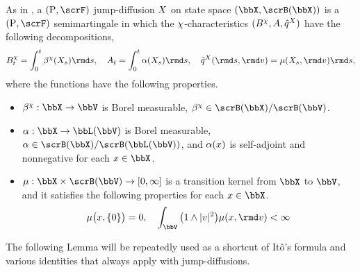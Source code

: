 As in \cite[Definition III.2.18]{jacod2003}, a $(\Prb, \scrF)$ jump-diffusion $X$ on state space $(\stateSpace, \scrB(\stateSpace))$ is a $(\Prb, \scrF)$ semimartingale in which the $\chi$-characteristics $(B^\chi, A, \hat{q}^X)$ have the following decompositions,
\begin{equation}
  \label{eq:jump-diffusion-characteristics}
  B^\trunc_t = \int_0^t \affDrift^\trunc(\X_s) \rmd s, \quad 
  A_t = \int_0^t \affDiff(\X_s) \rmd s, \quad
  \predproj{\jumpMeas^\X}(\rmd s,\rmd\markVar) = \affJump(\X_s, \rmd\markVar) \rmd s,
\end{equation}
where the functions have the following properties.
\begin{itemize}
  \item
    $\affDrift^\trunc: \stateSpace \rightarrow \vecSpace$ is Borel measurable, $\affDrift^\trunc \in \scrB(\stateSpace)/\scrB(\vecSpace)$.
  \item
    $\affDiff: \stateSpace \rightarrow \bbL(\vecSpace)$ is Borel measurable, $\affDiff \in \scrB(\stateSpace)/\scrB(\bbL(\vecSpace))$, and $\alpha(x)$ is self-adjoint and nonnegative for each $\stateVar \in \stateSpace$.
  \item
    $\affJump: \stateSpace \times \scrB(\vecSpace) \rightarrow [0,\infty]$ is a transition kernel from $\stateSpace$ to $\vecSpace$, and it satisfies the following properties for each $\stateVar \in \stateSpace$.
    \[
      \affJump\big(\stateVar, \{0\}\big) = 0, \quad \int_\vecSpace \big( 1 \wedge |\markVar|^2\big) \affJump(\stateVar, \rmd\markVar) < \infty
    \]
\end{itemize}



The following Lemma will be repeatedly used as a shortcut of It\^o's formula and various identities that always apply with jump-diffusions.



